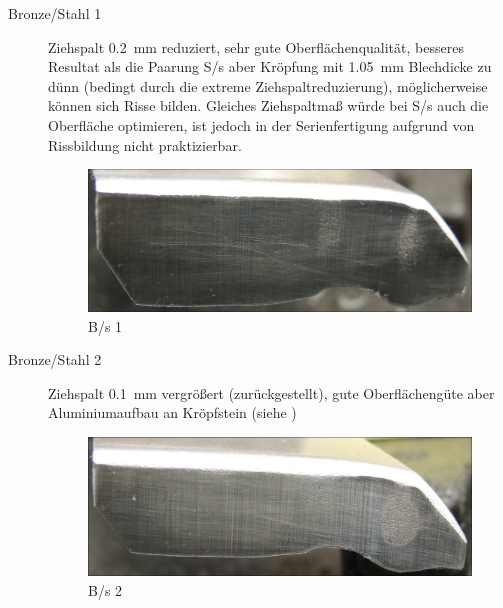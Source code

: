 \documentclass[12pt,a4paper,parskip]{scrartcl}
\begin{document}
\begin{description}
\item[Bronze/Stahl 1] Ziehspalt \SI{0.2}{\milli\meter} reduziert, sehr gute Oberflächenqualität, besseres Resultat als die Paarung  S/s aber Kröpfung mit \SI{1.05}{\milli\meter} Blechdicke zu dünn (bedingt durch die extreme Ziehspaltreduzierung),  möglicherweise können sich Risse bilden. Gleiches Ziehspaltmaß würde bei S/s auch die Oberfläche optimieren, ist  jedoch in der Serienfertigung aufgrund von Rissbildung nicht praktizierbar.
\begin{figure}[H]
\centering
\includegraphics[width=.8\textwidth]{Bs1a}
\caption{B/s 1}
\label{fig:Bs1a}
\end{figure}

\item[Bronze/Stahl 2] Ziehspalt \SI{0.1}{\milli\meter} vergrößert (zurückgestellt), gute Oberflächengüte aber Aluminiumaufbau an Kröpfstein (siehe )
\begin{figure}[H]
\centering
\includegraphics[width=.8\textwidth]{Bs2}
\caption{B/s 2}
\label{fig:Bs2}
\end{figure}


\end{description}
\end{document}
